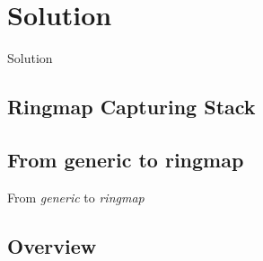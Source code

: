 \section{Solution}
\begin{frame}
	\begin{center}
	\huge{Solution}
	\end{center}
\end{frame}

\subsection*{Ringmap Capturing Stack}


\subsection*{From generic to ringmap}
\begin{frame}
	\begin{center}
		\huge{From \emph{generic} to \emph{ringmap}}
	\end{center}
\end{frame}


\subsection*{Overview}



